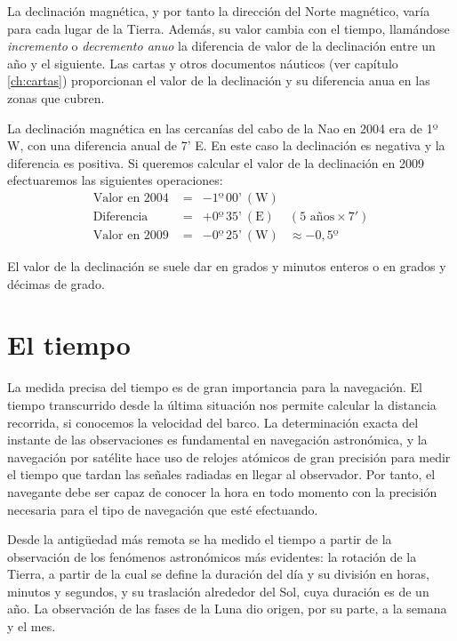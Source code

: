 La declinación magnética, y por tanto la dirección del Norte magnético, varía para cada lugar de la Tierra. Además, su valor cambia con el tiempo, llamándose \emph{incremento} o \emph{decremento anuo} la diferencia de valor de la declinación entre un año y el siguiente. Las cartas y otros documentos náuticos (ver capítulo \ref{ch:cartas}) proporcionan el valor de la declinación y su diferencia anua en las zonas que cubren. 

\begin{ejemplo}
La declinación magnética en las cercanías del cabo de la Nao en 2004 era de 1º W, con una diferencia anual de 7’ E. En este caso la declinación es negativa y la diferencia es positiva. Si queremos calcular el valor de la declinación en 2009 efectuaremos las siguientes operaciones: 
\[ 
\begin{array}{lcll}
\mbox{Valor en 2004 } &   = &  -1º \, 00’ \: \mathrm{(W) } \\
\mbox{Diferencia}         &   = &   +0º \, 35’ \: \mathrm{(E)}  &(\mbox{5 años} \times 7' )\\
\mbox{Valor en 2009}  &  = &   -0º \, 25’ \: \mathrm{(W)} & \approx -0,5º 
\end{array}
\]
\end{ejemplo}

El valor de la declinación se suele dar en grados y minutos enteros o en grados y décimas de grado. 

\section{El tiempo}


 
La medida precisa del tiempo es de gran importancia para la navegación. El tiempo transcurrido desde la última situación nos permite calcular la distancia recorrida, si conocemos la velocidad del barco. La determinación exacta del instante de las observaciones es fundamental en navegación astronómica, y la navegación por satélite hace uso de relojes atómicos de gran precisión para medir el tiempo que tardan las señales radiadas en llegar al observador. Por tanto, el navegante debe ser capaz de conocer la hora en todo momento con la precisión necesaria para el tipo de navegación que esté efectuando. 

Desde la antigüedad más remota se ha medido el tiempo a partir de la observación de los fenómenos astronómicos más evidentes: la rotación de la Tierra, a partir de la cual se define la duración del día y su división en horas, minutos y segundos, y su traslación alrededor del Sol, cuya duración es de un año. La observación de las fases de la Luna dio origen, por su parte, a la semana y el mes. 

